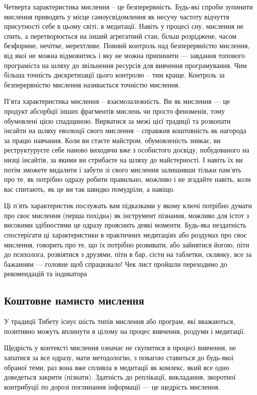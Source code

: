 Четверта характеристика мислення -- це безперервність.
Будь-які спроби зупинити мислення приводять у місце
самоусвідомлення як несучу частоту відчуття присутності
себе в цьому світі, в медитації. Навіть у процесі сну,
мислення не спить, а перетворюється на інший агрегатний
стан, більш розріджене, часом безформне, нечітке,
мерехтливе. Повний контроль над безперервністю мислення,
від якої не можна відмовитись і яку не можна припинити ---
завдання топового програміста на шляху до звільнення
ресурсів для вивчення програмування. Чим більша точність
дискретизації цього контролю – тим краще. Контроль за
безперервністю мислення називається точністю мислення.

П'ята характеристика мислення – взаємозалежність. Ви
як мислення --- це продукт абсорбції інших фрагментів
мислень чи просто феноменів, тому обумовлені цією спадщиною.
Вирватися за межі цієї традиції та розкопати інсайти на шляху
еволюції свого мислення – справжня коштовність як нагорода за
працю навчання. Коли ви стаєте майстром, обумовленість зникає,
ви реструктуруєте себе наново виходячи вже з особистого досвіду,
побудованого на низці інсайтів, за якими ви стрибаєте на шляху
до майстерності. І навіть їх ви потім зможете видалити і забути
зі свого мислення залишивши тільки пам'ять про те, як потрібно
одразу робити правильно, можливо і не згадайте навіть,
коли вас спитають, як це ви так швидко помудріли, а навіщо.

Ці п'ять характеристик послужать вам підказками у якому
ключі потрібно думати про своє мислення (перша похідна)
як інструмент пізнання, можливо для істот з високими
здібностями це одразу прояснить деякі моменти. Будь-яка
нездатність спостерігати ці характеристики в практичних
медитаціях або роздумах про своє мислення, говорить про
те, що їх потрібно розвивати, або зайнятися йогою, піти
до психолога, розвіятися з друзями, піти в бар, сісти
на таблетки, склянку, все за бажанням --- головне щоб
спрацювало! Чек лист пройшли переходимо до рекомендацій та індикатора

\subsection{Коштовне намисто мислення}

У традиції Тибету існує шість типів мислення або програм, які вважаються,
позитивно можуть вплинути в цілому на процес вивчення, роздуми і медитації.

Щедрість у контексті мислення означає не скупитися в процесі вивчення,
не хапатися за все одразу, мати методологію, з повагою ставиться до
будь-якої обраної теми, раз вона вже спливла в медитації як комлекс,
який все одно доведеться закрити (пізнати). Здатність до реплікації, викладання,
зворотної контрибуції по дорозі поглинання інформації --- це щедрість мислення.

